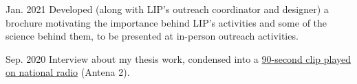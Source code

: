 \begin{cventries}
    {}{Jan. 2021}
    {Developed (along with LIP's outreach coordinator and designer) a brochure motivating the importance behind LIP's activities and some of the science behind them, to be presented at in-person outreach activities.}


    {}{Sep. 2020}
    {Interview about my thesis work, condensed into a \href{https://www.rtp.pt/play/p2936/e491211/90-segundos-ciencia}{90-second clip played on national radio} (Antena 2).}





\end{cventries}